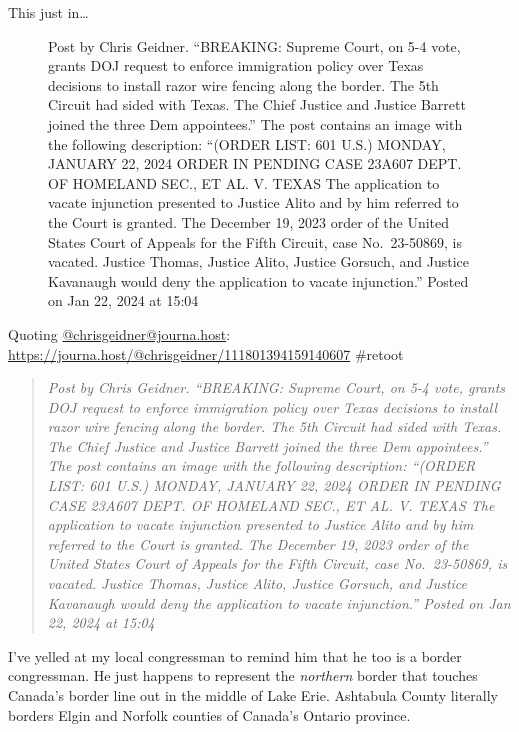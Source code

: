 This just in\ldots{}

\begin{figure}
\centering
{}
\caption{Post by Chris Geidner. ``BREAKING: Supreme Court, on 5-4 vote,
grants DOJ request to enforce immigration policy over Texas decisions to
install razor wire fencing along the border. The 5th Circuit had sided
with Texas. The Chief Justice and Justice Barrett joined the three Dem
appointees.'' The post contains an image with the following description:
``(ORDER LIST: 601 U.S.) MONDAY, JANUARY 22, 2024 ORDER IN PENDING CASE
23A607 DEPT. OF HOMELAND SEC., ET AL. V. TEXAS The application to vacate
injunction presented to Justice Alito and by him referred to the Court
is granted. The December 19, 2023 order of the United States Court of
Appeals for the Fifth Circuit, case No.~23-50869, is vacated. Justice
Thomas, Justice Alito, Justice Gorsuch, and Justice Kavanaugh would deny
the application to vacate injunction.'' Posted on Jan 22, 2024 at 15:04}
\end{figure}

Quoting
\href{https://journa.host/@chrisgeidner/}{@chrisgeidner@journa.host}:
\url{https://journa.host/@chrisgeidner/111801394159140607} \#retoot

\begin{quote}
\emph{Post by Chris Geidner. ``BREAKING: Supreme Court, on 5-4 vote,
grants DOJ request to enforce immigration policy over Texas decisions to
install razor wire fencing along the border. The 5th Circuit had sided
with Texas. The Chief Justice and Justice Barrett joined the three Dem
appointees.'' The post contains an image with the following description:
``(ORDER LIST: 601 U.S.) MONDAY, JANUARY 22, 2024 ORDER IN PENDING CASE
23A607 DEPT. OF HOMELAND SEC., ET AL. V. TEXAS The application to vacate
injunction presented to Justice Alito and by him referred to the Court
is granted. The December 19, 2023 order of the United States Court of
Appeals for the Fifth Circuit, case No.~23-50869, is vacated. Justice
Thomas, Justice Alito, Justice Gorsuch, and Justice Kavanaugh would deny
the application to vacate injunction.'' Posted on Jan 22, 2024 at 15:04}
\end{quote}

I've yelled at my local congressman to remind him that he too is a
border congressman. He just happens to represent the \emph{northern}
border that touches Canada's border line out in the middle of Lake Erie.
Ashtabula County literally borders Elgin and Norfolk counties of
Canada's Ontario province.

